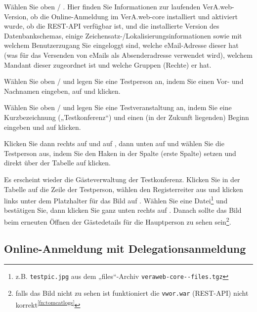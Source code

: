 Wählen Sie oben  / . Hier
finden Sie Informationen zur laufenden VerA.web-Version, ob die
Online-Anmeldung im VerA.web-core installiert und aktiviert wurde,
ob die REST-API verfügbar ist, und die installierte Version des
Datenbankschemas, einige Zeichensatz-/Lokalisierungsinformationen sowie
mit welchem Benutzerzugang Sie eingeloggt sind, welche eMail-Adresse
dieser hat (was für das Versenden von eMails als Absenderadresse
verwendet wird), welchem Mandant dieser zugeordnet ist und welche
Gruppen (Rechte) er hat.

Wählen Sie oben  / 
und legen Sie eine Testperson an, indem Sie einen Vor- und Nachnamen
eingeben, auf  und
 klicken.

Wählen Sie oben  /  und legen Sie eine Testveranstaltung an, indem Sie eine
Kurzbezeichnung („Testkonferenz“) und einen (in der Zukunft liegenden)
Beginn eingeben und auf  klicken.

Klicken Sie dann rechts auf  und auf
, dann unten auf 
und wählen Sie die Testperson aus, indem Sie den Haken in der Spalte
 (erste Spalte) setzen und direkt über der Tabelle auf
 klicken.

Es erscheint wieder die Gästeverwaltung der Testkonferenz. Klicken Sie
in der Tabelle auf die Zeile der Testperson, wählen den Registerreiter
 aus und klicken links unter dem Platzhalter
für das Bild auf . Wählen Sie eine
Datei\Hair\footnote{\label{fn:testpic}z.B. \texttt{testpic.jpg} aus dem
„files“-Archiv \texttt{veraweb-core-\vwiaverssw{}-files.tgz}} und bestätigen
Sie, dann klicken Sie ganz unten rechts auf .
Danach sollte das Bild beim erneuten Öffnen der Gästedetails für
die Hauptperson zu sehen sein\Hair\footnote{falls das Bild nicht
zu sehen ist funktioniert die \texttt{vwor.war} (REST-API) nicht
korrekt\Hair\textsuperscript{\ref{fn:tomcatlogs}}}.

\ifoa
\subsection{Online-Anmeldung mit Delegationsanmeldung}

